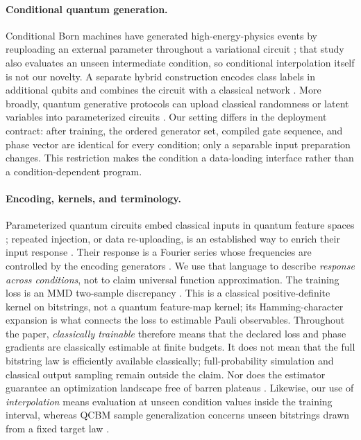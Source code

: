 \documentclass[a4paper,twocolumn,11pt,unpublished]{quantumarticle}
\begin{document}
\paragraph{Conditional quantum generation.}
Conditional Born machines have generated high-energy-physics events by
reuploading an external parameter throughout a variational circuit
\cite{kissConditionalBornMachine2022}; that study also evaluates an unseen
intermediate condition, so conditional interpolation itself is not our novelty.
A separate hybrid construction encodes
class labels in additional qubits and combines the circuit with a classical
network \cite{zengConditionalQCBM2023}.  More broadly, quantum generative
protocols can upload classical randomness or latent variables into
parameterized circuits \cite{kyriienkoProtocolsGenerative2024}.  Our setting
differs in the deployment contract: after training, the ordered generator set,
compiled gate sequence, and phase vector are identical for every condition;
only a separable input preparation changes.  This restriction makes the
condition a data-loading interface rather than a condition-dependent program.

\paragraph{Encoding, kernels, and terminology.}
Parameterized quantum circuits embed classical inputs in quantum feature
spaces \cite{schuldQuantumFeatureHilbert2019,havlicekSupervisedLearning2019};
repeated injection, or data re-uploading, is an established way to enrich their
input response \cite{perezSalinasDataReuploading2020}.  Their response is a
Fourier series whose frequencies are controlled by the encoding generators
\cite{gilVidalInputRedundancy2020,schuldEffectDataEncoding2021,
casasMultidimensionalFourier2023}.  We use that language to describe
\emph{response across conditions}, not to claim universal function
approximation.  The training loss is an MMD two-sample discrepancy
\cite{grettonKernelTwoSample2012}.  This is a classical positive-definite
kernel on bitstrings, not a quantum feature-map kernel; its Hamming-character expansion is
what connects the loss to estimable Pauli observables.  Throughout the paper,
\emph{classically trainable} therefore means that the declared loss and phase
gradients are classically estimable at finite budgets.  It does not mean that
the full bitstring law is efficiently available classically; full-probability
simulation and classical output sampling remain outside the claim.  Nor does
the estimator guarantee an optimization landscape free of barren plateaus
\cite{mccleanBarrenPlateaus2018,cerezoVariationalQuantumAlgorithms2021,
thanasilpExponentialConcentration2024,
rudolphTrainabilityBarriersOpportunities2024}.  Likewise, our use of
\emph{interpolation} means evaluation at unseen condition values inside the
training interval, whereas QCBM sample generalization concerns unseen
bitstrings drawn from a fixed target law
\cite{giliQuantumCircuitBornGeneralize2023}.
\end{document}
